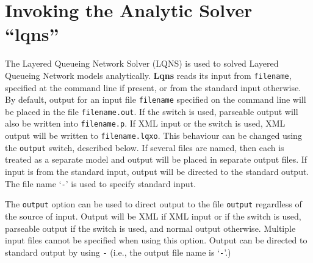 
\chapter{Invoking the Analytic Solver ``lqns''}
\label{sec:invoking-lqns}
The Layered Queueing Network Solver (LQNS) is used to
solved Layered Queueing Network models analytically.
\textbf{Lqns} reads its input from \texttt{filename}, specified at the
command line if present, or from the standard input otherwise.  By
default, output for an input file \texttt{filename} specified on the
command line will be placed in the file \texttt{filename.out}.  If the
 switch is used, parseable output will also be written into
\texttt{filename.p}. If XML input or the  switch is used, XML output will be written to 
\texttt{filename.lqxo}.  This behaviour can be changed using the
\texttt{output} switch, described below.  If several files are
named, then each is treated as a separate model and output will be
placed in separate output files.  If input is from the standard input,
output will be directed to the standard output.  The file name `\texttt{-}' is
used to specify standard input.


The \texttt{output} option can be used to direct output to the file
\texttt{output} regardless of the source of input.  Output will be XML
if XML input or if the  switch is used, parseable output if the  switch is used,
and normal output otherwise.  Multiple input files cannot be specified
when using this option.  Output can be directed to standard output by
using \texttt{-} (i.e., the output file name is `\texttt{-}'.)
